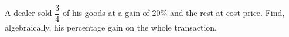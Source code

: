 A dealer sold $\dfrac34$ of his goods at a gain of $20\%$ and the rest at cost price. Find, algebraically, his percentage gain on the whole transaction.
